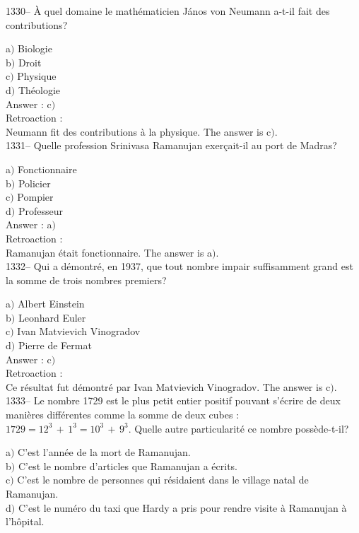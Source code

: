 ﻿\documentclass[letterpaper, 12pt]{article}
\begin{document}
1330-- \`A quel domaine le math\'ematicien J\'anos von Neumann
a-t-il fait des contributions?

a$)$ Biologie \\
b$)$ Droit \\
c$)$ Physique \\
d$)$ Th\'eologie\\

Answer : c$)$\\

Retroaction : \\
Neumann fit des contributions \`a la physique.
The answer is  c$)$.\\


1331-- Quelle profession Srinivasa Ramanujan exer\c cait-il au port
de Madras?

a$)$ Fonctionnaire \\
b$)$ Policier \\
c$)$ Pompier \\
d$)$ Professeur\\

Answer : a$)$\\

Retroaction : \\
Ramanujan \'etait fonctionnaire.
The answer is  a$)$.\\

1332-- Qui a d\'emontr\'e, en 1937, que tout nombre impair
suffisamment grand est la somme de trois nombres premiers?

a$)$ Albert Einstein \\
b$)$ Leonhard Euler \\
c$)$ Ivan Matvievich Vinogradov \\
d$)$ Pierre de Fermat\\

Answer : c$)$\\

Retroaction : \\
Ce r\'esultat fut d\'emontr\'e par Ivan Matvievich Vinogradov.
The answer is  c$)$.\\




1333-- Le nombre 1729 est le plus petit entier positif pouvant
s'\'ecrire de deux mani\`eres diff\'erentes comme la somme de deux
cubes : $1729=12^3\,+\,1^3=10^3\,+\,9^3$. Quelle autre
particularit\'e ce nombre poss\`ede-t-il?

a$)$ C'est l'ann\'ee de la mort de Ramanujan. \\
b$)$ C'est le nombre d'articles que Ramanujan a \'ecrits. \\
c$)$ C'est le nombre de personnes qui r\'esidaient dans le village natal de
Ramanujan. \\
d$)$ C'est le num\'ero du taxi que Hardy a pris pour rendre visite \`a
Ramanujan \`a l'h\^opital.\\
\end{document}
